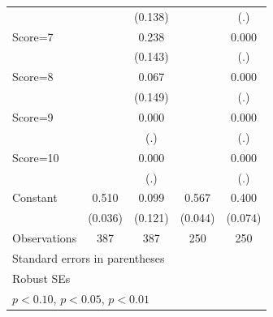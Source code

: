 \begin{table}[htbp]
\begin{tabular}{l*{4}{c}}
                &                  &  (0.138)         &                  &      (.)         \\
Score=7         &                  &    0.238\sym{*}  &                  &    0.000         \\
                &                  &  (0.143)         &                  &      (.)         \\
Score=8         &                  &    0.067         &                  &    0.000         \\
                &                  &  (0.149)         &                  &      (.)         \\
Score=9         &                  &    0.000         &                  &    0.000         \\
                &                  &      (.)         &                  &      (.)         \\
Score=10        &                  &    0.000         &                  &    0.000         \\
                &                  &      (.)         &                  &      (.)         \\
Constant        &    0.510\sym{***}&    0.099         &    0.567\sym{***}&    0.400\sym{***}\\
                &  (0.036)         &  (0.121)         &  (0.044)         &  (0.074)         \\
\hline
Observations    &      387         &      387         &      250         &      250         \\
\hline\hline
\multicolumn{5}{l}{\footnotesize Standard errors in parentheses}\\
\multicolumn{5}{l}{\footnotesize Robust SEs}\\
\multicolumn{5}{l}{\footnotesize \sym{*} \(p<0.10\), \sym{**} \(p<0.05\), \sym{***} \(p<0.01\)}\\
\end{tabular}
\end{table}
